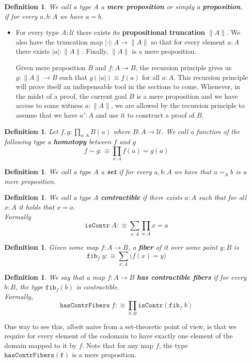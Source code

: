 \documentclass[12pt]{report}
\newtheorem{defn}[thm]{Definition}
\begin{document}
	\begin{defn}
	We call a type $A$ a \textbf{mere proposition} or simply a \textbf{proposition}, if for every $a,b : A$ we have $a = b$.
	\end{defn}
\begin{itemize}
	\item For every type $A : \mathcal{U}$ there exists its \textbf{propositional truncation} $\| A \|$. 
	We also have the truncation map $|\cdot| : A \rightarrow \lVert A \rVert$ so that for every element $a : A$ there exists $|a| : \| A\|$. 
	Finally, $\lVert A\rVert$ is a mere proposition.  

	Given mere proposition $B$ and $f : A \rightarrow B$, the recursion principle gives us $g : \|A\| \rightarrow B$ such that $g(|a|) \equiv f(a)$ for all $a : A$.
	This recursion principle will prove itself an indispensable tool in the sections to come. 
	Whenever, in the midst of a proof, the current goal $B$ is a mere proposition and we have access to some witness $a : \lVert A \rVert$, we are allowed by the recursion principle to assume that we have $a' : A$ and use it to construct a proof of $B$.
\end{itemize}
	\begin{defn}
	Let $f,g : \prod_{a:A}B(a)$ where $B :A \rightarrow \mathcal{U}$. 
	We call a function of the following type a \textbf{homotopy} between $f$ and $g$
	$$f\sim g :\equiv \prod_{a:A}f(a) = g(a)$$
	\end{defn}

	\begin{defn}
	We call a type $A$ a \textbf{set} if for every $a,b : A$ we have that $a =_A b$ is a mere proposition.
	\end{defn}

	\begin{defn}
	We call a type $A$ \textbf{contractible} if there exists $a : A$ such that for all $x : A$ it holds that $x = a$.\\
	Formally
	$$\mathtt{isContr}\; A :\equiv \sum_{x : A}\prod_{a :A}x=a$$
	\end{defn}

	\begin{defn}
	Given some map $f : A \rightarrow B$, a \textbf{fiber} of it over some point $y : B$ is
	$$\mathtt{fib}_f\; y :\equiv \sum_{x : A} \big(f(x) = y\big)$$
	\end{defn}

	\begin{defn}
	We say that a map $f : A\rightarrow B$ \textbf{has contractible fibers} if for every $b : B$, the type $\mathtt{fib}_f(b)$ is contractible.\\
	Formally, 
	$$ \mathtt{hasContrFibers}\; f : \equiv \prod_{b : B} \mathtt{isContr}(\mathtt{fib}_f\; b)$$
 	\end{defn}
 	One way to see this, albeit naive from a set-theoretic point of view, is that we require for every element of the codomain to have exactly one element of the domain mapped to it by $f$. 
 	Note that for any map $f$, the type $\mathtt{hasContrFibers(f)}$ is a mere proposition. 
\end{document}

